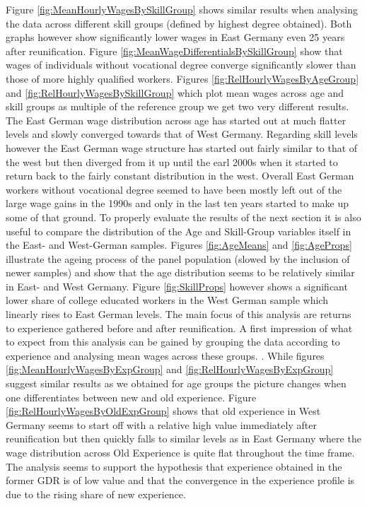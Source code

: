 \documentclass{article}
\begin{document}
Figure \ref{fig:MeanHourlyWagesBySkillGroup} shows similar results when analysing the data across different skill groups (defined by highest degree obtained). Both graphs however show significantly lower wages in East Germany even 25 years after reunification. Figure \ref{fig:MeanWageDifferentialsBySkillGroup} show that wages of individuals without vocational degree converge significantly slower than those of more highly qualified workers. Figures \ref{fig:RelHourlyWagesByAgeGroup} and \ref{fig:RelHourlyWagesBySkillGroup} which plot mean wages across age and skill groups as multiple of the reference group we get two very different results. The East German wage distribution across age has started out at much flatter levels and slowly converged towards that of West Germany. Regarding skill levels however the East German wage structure has started out fairly similar to that of the west but then diverged from it up until the earl 2000s when it started to return back to the fairly constant distribution in the west. Overall East German workers without vocational degree seemed to have been mostly left out of the  large wage gains in the 1990s and only in the last ten years started to make up some of that ground.
To properly evaluate the results of the next section it is also useful to compare the distribution of the Age and Skill-Group variables itself in the East- and West-German samples. 
Figures \ref{fig:AgeMeans} and \ref{fig:AgeProps} illustrate the ageing process of the panel population (slowed by the inclusion of newer samples) and show that the age distribution seems to be relatively similar in East- and West Germany. Figure \ref{fig:SkillProps} however shows a significant  lower share of college educated workers in the West German sample which linearly rises to East German levels. 
The main focus of this analysis are returns to experience gathered before and after reunification. A first impression of what to expect from this analysis can be gained by grouping the data according to experience and analysing mean wages across these groups.
. While figures  \ref{fig:MeanHourlyWagesByExpGroup} and \ref{fig:RelHourlyWagesByExpGroup} suggest similar results as we obtained for age groups the picture changes when one differentiates between new and old experience. Figure \ref{fig:RelHourlyWagesByOldExpGroup} shows that old experience in West Germany seems to start off with a relative high value immediately after reunification but then quickly falls to similar levels as in East Germany where the wage distribution across Old Experience is quite flat throughout the time frame. The analysis seems to support the hypothesis that experience obtained in the former GDR is of low value and that the convergence in the experience profile is due to the rising share of new experience.
\end{document}
